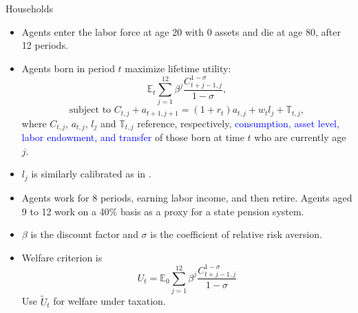 \documentclass[10pt,aspectratio=169]{beamer}
\begin{document}
\begin{frame}[fragile]{Households}
\begin{footnotesize}
\begin{itemize}
    \item Agents enter the labor force at age 20 with 0 assets and die at age 80, after 12 periods.
    \item Agents born in period $t$ maximize lifetime utility:
    \begin{equation}
 {\mathbb E}_t \sum\limits_{j = 1}^{12} \beta^j \frac{C_{t+j-1, j}^{1-\sigma}}{1-\sigma} ,
\end{equation}
\begin{equation}
\text{subject to } C_{t,j}+a_{t+1, j+1}=(1+r_t)a_{t,j} +w_{t} l_{j} + \mathbb{T}_{t,j},
\end{equation}
where $C_{t,j}$, $a_{t,j}$, $l_{j}$ and $\mathbb{T}_{t,j}$ reference, respectively, \textcolor{blue}{consumption, asset level, labor endowment, and transfer} of those born at time $t$ who are currently age $j$.
\item $l_{j}$ is similarly calibrated as in \cite{kotlikoff2021making}. \item Agents work for 8 periods, earning labor income, and then retire. Agents aged 9 to 12 work on a 40\% basis as a proxy for a state pension system.
\item $\beta$ is the discount factor and $\sigma$ is the coefficient of relative risk aversion.
\item Welfare criterion is
$$ U_t= {\mathbb E}_0  \sum\limits_{j = 1}^{12} \beta^j \frac{C_{t+j-1, j}^{1-\sigma}}{1-\sigma} $$
Use $ \tilde U_t $ for welfare under taxation.
\end{itemize}
\end{footnotesize}
\end{frame}
\end{document}
